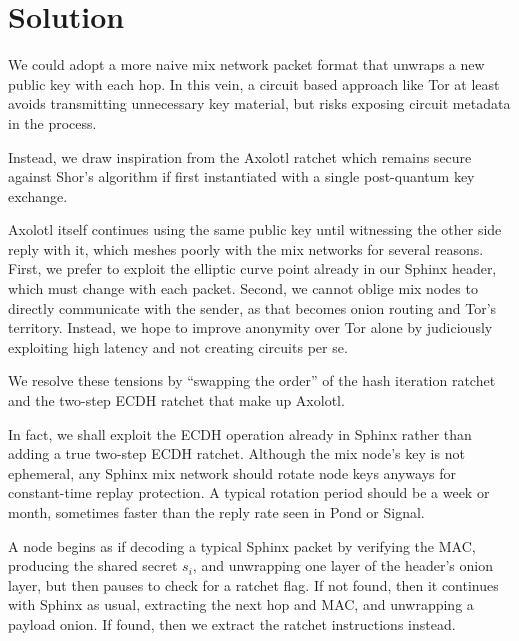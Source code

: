 \documentclass[twoside,letterpaper]{sig-alternate}
\begin{document}
\section{Solution}

We could adopt a more naive mix network packet format that unwraps
a new public key with each hop.  In this vein, a circuit based approach
like Tor at least avoids transmitting unnecessary key material, but
risks exposing circuit metadata in the process. 

Instead, we draw inspiration from the Axolotl ratchet %
which remains secure against Shor's algorithm if
 first instantiated with a single post-quantum key exchange. 

Axolotl itself continues using the same public key until witnessing
 the other side reply with it, which meshes poorly with the mix networks
for several reasons.
%
First, we prefer to exploit the elliptic curve point
 already in our Sphinx header, which must change with each packet.
%
Second, we cannot oblige mix nodes to directly communicate with
 the sender, as that becomes onion routing and Tor's territory.
%
Instead, we hope to improve anonymity over Tor alone by
 judiciously exploiting high latency and not creating circuits per se.

We resolve these tensions by ``swapping the order'' of the hash iteration
ratchet and the two-step ECDH ratchet that make up Axolotl.  

In fact, we shall exploit the ECDH operation already in Sphinx rather
 than adding a true two-step ECDH ratchet.
Although the mix node's key is not ephemeral, any Sphinx mix network
should rotate node keys anyways for constant-time replay protection.
A typical rotation period should be a week or month, sometimes
 faster than the reply rate seen in Pond or Signal.

\smallskip


\def\cn{\texttt{cn}}
\def\ck{\texttt{ck}}
\def\DH{\texttt{DH}}
\def\lk{\texttt{lk}}
\def\mk{\texttt{mk}}
\def\sk{\texttt{sk}}
\def\ECDH{\textrm{ECDH}}

A node begins as if decoding a typical Sphinx packet by
 verifying the MAC,
 producing the shared secret $s_i$, and 
 unwrapping one layer of the header's onion layer,
but then pauses to check for a ratchet flag. 
If not found, then it continues with Sphinx as usual, 
 extracting the next hop and MAC, and unwrapping a payload onion.
If found, then we extract the ratchet instructions instead.
\end{document}
